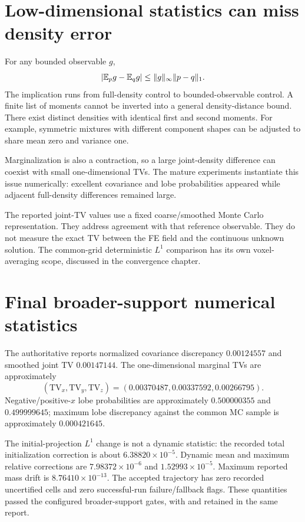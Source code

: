 \section{Low-dimensional statistics can miss density error}
For any bounded observable $g$,
\begin{equation}
 |\mathbb E_pg-\mathbb E_qg|\le\|g\|_\infty\|p-q\|_1.
\end{equation}
The implication runs from full-density control to bounded-observable control. A finite list of moments cannot be inverted into a general density-distance bound. There exist distinct densities with identical first and second moments. For example, symmetric mixtures with different component shapes can be adjusted to share mean zero and variance one.

Marginalization is also a contraction, so a large joint-density difference can coexist with small one-dimensional TVs. The mature experiments instantiate this issue numerically: excellent covariance and lobe probabilities appeared while adjacent full-density differences remained large.

The reported joint-TV values use a fixed coarse/smoothed Monte Carlo representation. They address agreement with that reference observable. They do not measure the exact TV between the FE field and the continuous unknown solution. The common-grid deterministic $L^1$ comparison has its own voxel-averaging scope, discussed in the convergence chapter.

\section{Final broader-support numerical statistics}
The authoritative  reports normalized covariance discrepancy $0.00124557$ and smoothed joint TV $0.00147144$. The one-dimensional marginal TVs are approximately
\begin{equation}
 (\mathrm{TV}_x,\mathrm{TV}_y,\mathrm{TV}_z)=(0.00370487,0.00337592,0.00266795).
\end{equation}
Negative/positive-$x$ lobe probabilities are approximately $0.500000355$ and $0.499999645$; maximum lobe discrepancy against the common MC sample is approximately $0.000421645$.

The initial-projection $L^1$ change is not a dynamic statistic: the recorded total initialization correction is about $6.38820\times10^{-5}$. Dynamic mean and maximum relative corrections are $7.98372\times10^{-6}$ and $1.52993\times10^{-5}$. Maximum reported mass drift is $8.76410\times10^{-13}$. The accepted trajectory has zero recorded uncertified cells and zero successful-run failure/fallback flags. These quantities passed the configured broader-support gates, with  and  retained in the same report.

